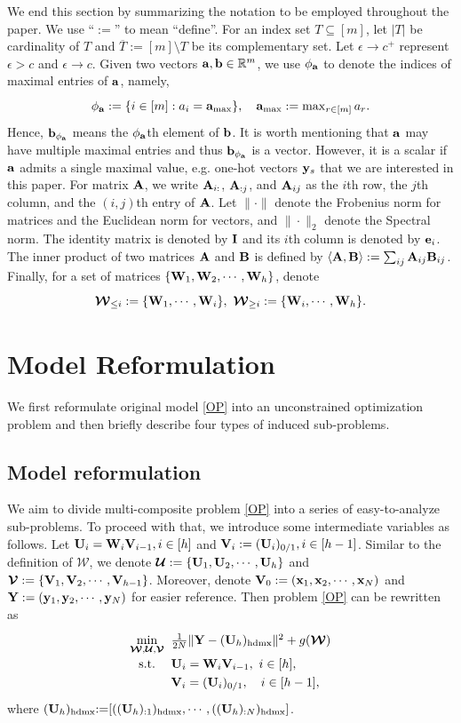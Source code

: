 \documentclass[journal]{IEEEtran}
\newcommand{\ba}{\begin{array}}
\newcommand{\ea}{\end{array}}
\newcommand{\be}{\begin{equation}}
\newcommand{\ee}{\end{equation}}
\def\R{\mathbb{R}}
\def\A{{\bf A}}
\def\B{{\bf B}}
\def\I{{\bf I}}
\def\U{{\bf U}}
\def\V{{\bf V}}
\def\W{{\bf W}}
\def\Y{{\bf Y}}
\def\CU{{\boldsymbol{\mathcal U}}}
\def\CV{{\boldsymbol{\mathcal V}}}
\def\CW{{\boldsymbol{\mathcal W}}}
\def\a{{\bf a}}
\def\am{{\phi_{\bf a}}}
\def\b{{\bf b}}
\def\e{{\bf e}}
\def\hd{{\rm hdmx}}
\def\x{{\bf x}}
\def\y{{\bf y}}
\begin{document}
We end this section by summarizing the notation to be employed throughout the paper.
We use ``$:=$'' to mean ``define''. For an index set $T\subseteq[m]$, let $|T|$ be cardinality of $T$ and $\overline T :=[m]\setminus T$ be its complementary set. Let $\epsilon\to c^+$ represent $\epsilon>c$ and $\epsilon\to c$. Given two vectors $\a,\b\in\R^m$, we use $\am$  to denote the indices of maximal entries of $\a$, namely,
\be
 \arraycolsep=1.4pt\def\arraystretch{1.25}
\ba{lll}
\am:=\{i\in[m]: a_i = \a_{\max}\},~~~\a_{\max}:= \max_{r\in[m]} a_r.
\ea
\ee
Hence,   $\b_{\phi_{\a}}$ means the $\phi_{\a}$th element of $\b$. {It is worth mentioning that $\a$ may have multiple maximal entries and thus $\b_{\phi_{\a}}$ is a vector. However, it is a scalar if $\a$ admits a single maximal value, e.g. one-hot vectors $\y_s$ that we are interested in this paper.} For matrix $\A$, we write $\A_{i:}$, $\A_{:j}$, and $\A_{ij}$ as the $i$th row,  the $j$th column,  and the $(i,j)$th entry of $\A$.
Let $\|\cdot\|$ denote the Frobenius norm for matrices and the Euclidean norm for vectors, and $\|\cdot\|_2$ denote the Spectral norm.  The identity matrix is denoted by  $\I$ and  its  $i$th column is denoted by $\e_i$. The inner product of  two matrices $\A$ and $ \B$ is defined by $\langle \A, \B \rangle:=\sum_{ij} \A_{ij}\B_{ij}$. Finally, for a set of matrices $\{\W_1,\W_2,\cdots,\W_h\}$, denote
\be
\ba{lll}
\CW_{\leq i}:=\{\W_1,\cdots,\W_{i}\},~
 \CW_{\geq i}:=\{\W_{i},\cdots,\W_h\}.
\ea
\ee
\section{Model Reformulation}
We first reformulate original model \eqref{OP} into an unconstrained optimization problem and then briefly describe four types of induced sub-problems.
\subsection{Model reformulation}
We aim to divide multi-composite problem \eqref{OP} into a series of easy-to-analyze sub-problems. To proceed with that, we introduce some intermediate variables as follows. Let ${\U_{i}}=\W_i\V_{i-1}, i\in[h]$ and $\V_i:=(\U_{i})_{0/1}, i\in[h-1]$. Similar to the definition of $\CW$, we denote $\CU:=\{\U_1,\U_2,\cdots,\U_h\}$ and $\CV:=\{\V_1,\V_2,\cdots,\V_{h-1}\}$. Moreover, denote $\V_0:=(\x_1,\x_2,\cdots,\x_N)$ and $\Y:=(\y_1,\y_2,\cdots,\y_N)$ for easier reference. Then problem \eqref{OP} can be rewritten as
\be\label{OP010}
 \arraycolsep=1.4pt\def\arraystretch{1.25}
\ba{cll}
\min\limits_{\CW, \CU, \CV} &&\frac{1}{2N} \|\Y- (\U_h)_{\hd}\|^{2} + g(\CW)\\
{\rm s.t.} &&\U_i=\W_i\V_{i-1},~i\in[h],\\
&&\V_{i}=(\U_i)_{0/1},~~~i\in[h-1],
\ea
\ee
where $(\U_h)_{\hd}{:=}[((\U_h)_{:1})_\hd, \cdots , ((\U_h)_{:N})_\hd]$.
\end{document}
